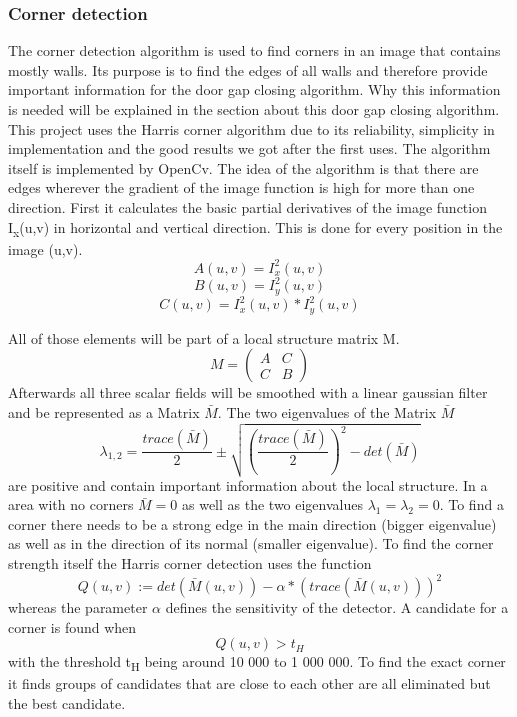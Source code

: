 \pagebreak

\subsubsection{Corner detection}
\label{subsub:CornerDetection}
The corner detection algorithm is used to find corners in an image that contains mostly walls. Its purpose is to find the edges of all walls and therefore provide important information for the door gap closing algorithm. Why this information is needed will be explained in the section about this door gap closing algorithm.
This project uses the Harris corner algorithm due to its reliability, simplicity in implementation and the good results we got after the first uses. The algorithm itself is implemented by OpenCv.
The idea of the algorithm is that there are edges wherever the gradient of the image function is high for more than one direction.
First it calculates the basic partial derivatives of the image function I\textsubscript{x}(u,v) in horizontal and vertical direction. This is done for every position in the image (u,v).
\[A(u,v) = I_{x}^2(u,v)\]
\[B(u,v) = I_{y}^2(u,v)\]
\[C(u,v) = I_{x}^2(u,v) * I_{y}^2(u,v)\]

All of those elements will be part of a local structure matrix M.
\[M = \begin{pmatrix} A & C \\ C & B \end{pmatrix}\]
Afterwards all three scalar fields will be smoothed with a linear gaussian filter and be represented as a Matrix \begin{math}\bar{M}\end{math}.
The two eigenvalues of the Matrix \begin{math}\bar{M}\end{math}
\[\lambda_{1,2} = \dfrac{trace(\bar{M})}{2} \pm \sqrt{(\dfrac{trace(\bar{M})}{2})^2 - det(\bar{M})} \]
are positive and contain important information about the local structure. In a area with no corners \begin{math}\bar{M} = 0\end{math}  as well as the two eigenvalues \begin{math}\lambda_1 = \lambda_2 = 0\end{math}. To find a corner there needs to be a strong edge in the main direction (bigger eigenvalue) as well as in the direction of its normal (smaller eigenvalue). 
To find the corner strength itself the Harris corner detection uses the function 
\[Q(u,v) := det(\bar{M}(u,v)) - \alpha * (trace(\bar{M}(u,v)))^2\]
whereas the parameter \begin{math}\alpha\end{math} defines the sensitivity of the detector. A candidate for a corner is found when
\[Q(u,v) > t_H\]
with the threshold t\textsubscript{H} being around 10 000 to 1 000 000. To find the exact corner it finds groups of candidates that are close to each other are all eliminated but the best candidate.

